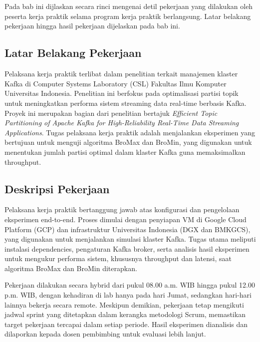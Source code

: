 \chapter{\babDua}
\label{bab:2}
Pada bab ini dijlaskan secara rinci mengenai detil pekerjaan yang dilakukan oleh peserta kerja praktik selama program kerja praktik berlangsung. Latar belakang pekerjaan hingga hasil pekerjaan dijelaskan pada bab ini.

\section{Latar Belakang Pekerjaan}
\label{sec:latar-belakang}

Pelaksana kerja praktik terlibat dalam penelitian terkait manajemen klaster Kafka di Computer Systems Laboratory (CSL) Fakultas Ilmu Komputer Universitas Indonesia. Penelitian ini berfokus pada optimalisasi partisi topik untuk meningkatkan performa sistem streaming data real-time berbasis Kafka. Proyek ini merupakan bagian dari penelitian bertajuk \textit{Efficient Topic Partitioning of Apache Kafka for High-Reliability Real-Time Data Streaming Applications}. Tugas pelaksana kerja praktik adalah menjalankan eksperimen yang bertujuan untuk menguji algoritma BroMax dan BroMin, yang digunakan untuk menentukan jumlah partisi optimal dalam klaster Kafka guna memaksimalkan throughput.

\section{Deskripsi Pekerjaan}
\label{sec:deskripsi-pekerjaan}

Pelaksana kerja praktik bertanggung jawab atas konfigurasi dan pengelolaan eksperimen end-to-end. Proses dimulai dengan penyiapan VM di Google Cloud Platform (GCP) dan infrastruktur Universitas Indonesia (DGX dan BMKGCS), yang digunakan untuk menjalankan simulasi klaster Kafka. Tugas utama meliputi instalasi dependencies, pengaturan Kafka broker, serta analisis hasil eksperimen untuk mengukur performa sistem, khususnya throughput dan latensi, saat algoritma BroMax dan BroMin diterapkan.

Pekerjaan dilakukan secara hybrid dari pukul 08.00 a.m. WIB hingga pukul 12.00 p.m. WIB, dengan kehadiran di lab hanya pada hari Jumat, sedangkan hari-hari lainnya bekerja secara remote. Meskipun demikian, pekerjaan tetap mengikuti jadwal sprint yang ditetapkan dalam kerangka metodologi Scrum, memastikan target pekerjaan tercapai dalam setiap periode. Hasil eksperimen dianalisis dan dilaporkan kepada dosen pembimbing untuk evaluasi lebih lanjut.

